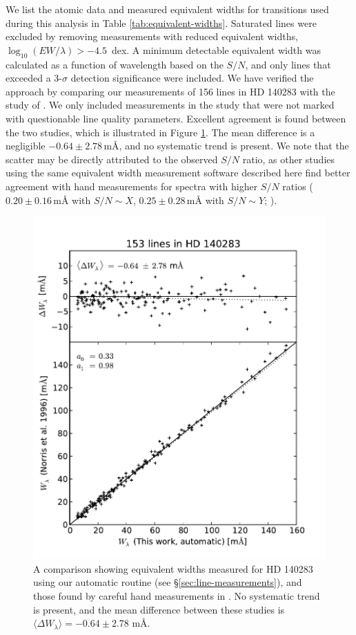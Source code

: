 \documentclass{emulateapj}
\begin{document}
We list the atomic data and measured equivalent widths for transitions used during this analysis in Table \ref{tab:equivalent-widths}. Saturated lines were excluded by removing measurements with reduced equivalent widths, $\log_{10}{(EW/\lambda)} > -4.5$\, dex. A minimum detectable equivalent width was calculated as a function of wavelength based on the $S/N$, and only lines that exceeded a 3-$\sigma$ detection significance were included. We have verified the approach by comparing our measurements of 156 lines in HD 140283 with the study of \citet{norris;et-al_1996}. We only included measurements in the \citet{norris;et-al_1996} study that were not marked with questionable line quality parameters. Excellent agreement is found between the two studies, which is illustrated in Figure \ref{fig:ew-compare}. The mean difference is a negligible $-0.64 \pm 2.78$\,m\AA{}, and no systematic trend is present. We note that the scatter may be directly attributed to the observed $S/N$ ratio, as other studies using the same equivalent width measurement software described here find better agreement with hand measurements for spectra with higher $S/N$ ratios ($0.20 \pm 0.16$\,m{\AA} with $S/N \sim X$, $0.25 \pm 0.28$\,m{\AA} with $S/N \sim{} Y$; \citet{frebel;et-al_2013}).

\begin{figure}[h]
	\includegraphics[width=\columnwidth]{./figures/smh-norris.pdf}
	\caption{A comparison showing equivalent widths measured for HD 140283 using our automatic routine (see \S\ref{sec:line-measurements}), and those found by careful hand measurements in \citet{norris;et-al_1996}. No systematic trend is present, and the mean difference between these studies is $\langle\Delta{}W_\lambda\rangle = -0.64 \pm 2.78$ m\AA{}.}
	\label{fig:ew-compare}
\end{figure}
\end{document}

